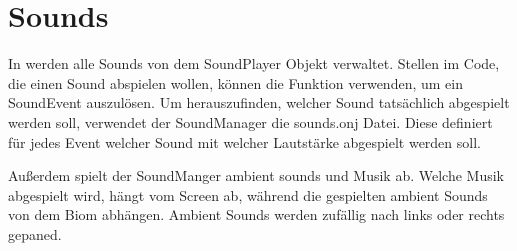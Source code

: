 
\section{Sounds}\label{sec:sounds}

\renewcommand{\kapitelautor}{Autor: Marvin Kurka}

In \FF werden alle Sounds von dem SoundPlayer Objekt verwaltet.
Stellen im Code, die einen Sound abspielen wollen, können die  Funktion verwenden,
um ein SoundEvent auszulösen.
Um herauszufinden, welcher Sound tatsächlich abgespielt werden soll, verwendet der SoundManager die sounds.onj Datei.
Diese definiert für jedes Event welcher Sound mit welcher Lautstärke abgespielt werden soll.

Außerdem spielt der SoundManger ambient sounds und Musik ab.
Welche Musik abgespielt wird, hängt vom Screen ab, während die gespielten ambient Sounds von dem Biom abhängen.
Ambient Sounds werden zufällig nach links oder rechts gepaned.

\renewcommand{\kapitelautor}{}
